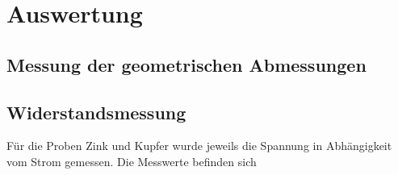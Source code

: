 \section{Auswertung}

\subsection{Messung der geometrischen Abmessungen}

\subsection{Widerstandsmessung}
Für die Proben Zink und Kupfer wurde jeweils die Spannung in Abhängigkeit vom Strom gemessen. Die Messwerte befinden sich

\begin{minipage}{\textwidth}

\hfill

\end{minipage}

